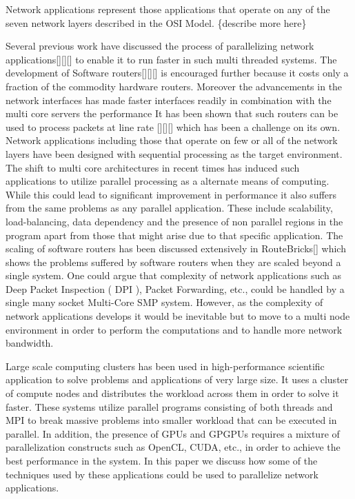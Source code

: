 \documentclass[prodmode,acmtaco]{acmsmall}
\begin{document}
Network applications represent those applications that operate on any of the seven network layers described in the OSI Model. \{describe more here\}

Several previous work have discussed the process of parallelizing network applications[][][] to enable it to run faster in such multi threaded systems. The development of Software routers[][][] is encouraged further because it costs only a fraction of the commodity hardware routers. Moreover the advancements in the network interfaces has made faster interfaces readily in combination with the multi core servers the performance  It has been shown that such routers can be used to process packets at line rate [][][] which has been a challenge on its own. Network applications including those that operate on few or all of the network layers have been designed with sequential processing as the target environment. The shift to multi core architectures in recent times has induced such applications to utilize parallel processing as a alternate means of computing. While this could lead to significant improvement in performance it also suffers from the same problems as any parallel application. These include scalability, load-balancing, data dependency and the presence of non parallel regions in the program apart from those that might arise due to that specific application. The scaling of software routers has been discussed extensively in RouteBricks[] which shows the problems suffered by software routers when they are scaled beyond a single system. One could argue that complexity of network applications such as Deep Packet Inspection ( DPI ), Packet Forwarding, etc., could be handled by a single many socket Multi-Core SMP system. However, as the complexity of network applications develops it would be inevitable but to move to a multi node environment in order to perform the computations and to handle more network bandwidth.

Large scale computing clusters has been used in high-performance scientific application to solve problems and applications of very large size. It uses a cluster of compute nodes and distributes the workload across them in order to solve it faster. These systems utilize parallel programs consisting of both threads and MPI to break massive problems into smaller workload that can be executed in parallel. In addition, the presence of GPUs and GPGPUs requires a mixture of parallelization constructs such as OpenCL, CUDA, etc., in order to achieve the best performance in the system. In this paper we discuss how some of the techniques used by these applications could be used to parallelize network applications.
\end{document}
